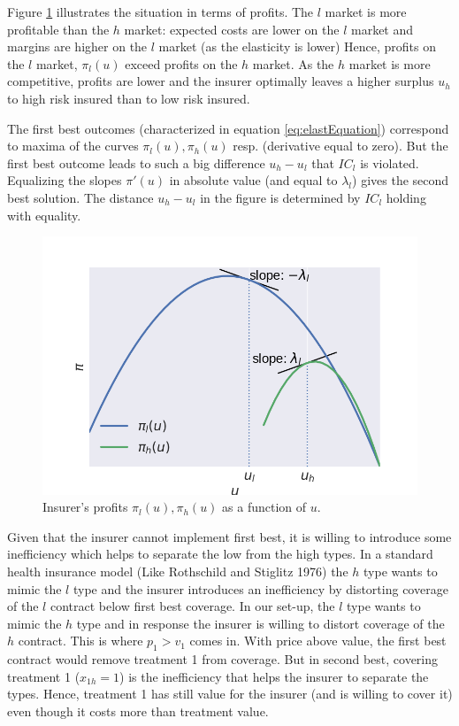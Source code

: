 \documentclass[a4paper,12pt]{article}
\makeatletter
\newcommand{\citeprocitem}[2]{\hyper@linkstart{cite}{citeproc_bib_item_#1}#2\hyper@linkend}
\makeatother
\begin{document}
Figure \ref{fig:profitfunctions} illustrates the situation in terms of profits. The \(l\) market is more profitable than the \(h\) market: expected costs are lower on the \(l\) market and margins are higher on the \(l\) market (as the elasticity is lower) Hence, profits on the \(l\) market, \(\pi_l(u)\) exceed profits on the \(h\) market. As the \(h\) market is more competitive, profits are lower and the insurer optimally leaves a higher surplus \(u_h\) to high risk insured than to low risk insured.

The first best outcomes (characterized in equation \eqref{eq:elastEquation}) correspond to maxima of the curves \(\pi_l(u),\pi_h(u)\) resp. (derivative equal to zero). But the first best outcome leads to such a big difference \(u_h-u_l\) that \(IC_l\) is violated. Equalizing the slopes \(\pi'(u)\) in absolute value (and equal to \(\lambda_l\)) gives the second best solution. The distance \(u_h - u_l\) in the figure is determined by \(IC_l\) holding with equality.


\begin{figure}[htbp]
\centering
\includegraphics[width=.9\linewidth]{profitfunctions.png}
\caption{\label{fig:profitfunctions}Insurer's profits \(\pi_{l}(u),\pi_{h}(u)\) as a function of \(u\).}
\end{figure}

Given that the insurer cannot implement first best, it is willing to introduce some inefficiency which helps to separate the low from the high types. In a standard health insurance model (Like \citeprocitem{34}{Rothschild and Stiglitz 1976}) the \(h\) type wants to mimic the \(l\) type and the insurer introduces an inefficiency by distorting coverage of the \(l\) contract below first best coverage. In our set-up, the \(l\) type wants to mimic the \(h\) type and in response the insurer is willing to distort coverage of the \(h\) contract. This is where \(p_1>v_1\) comes in. With price above value, the first best contract would remove treatment 1 from coverage. But in second best, covering treatment 1 (\(x_{1h}=1\)) is the inefficiency that helps the insurer to separate the types. Hence, treatment 1 has still value for the insurer (and is willing to cover it) even though it costs more than treatment value.
\end{document}
